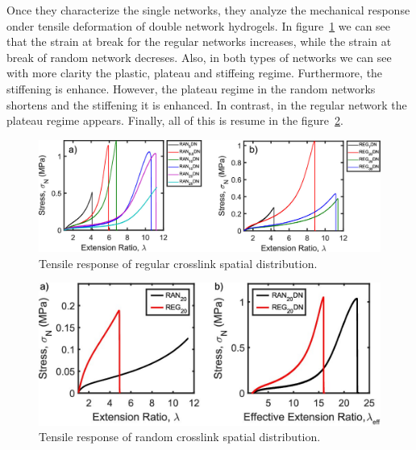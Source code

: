 Once they characterize the single networks, they analyze the mechanical response onder tensile deformation of double network hydrogels.
In figure~\ref{fig:REGRANDNnetworks} we can see that the strain at break for the regular networks increases, while the strain at break of random network decreses. 
Also, in both types of networks we can see with more clarity the plastic, plateau and stiffeing regime.
Furthermore, the stiffening is enhance.
However, the plateau regime in the random networks shortens and the stiffening it is enhanced.
In contrast, in the regular network the plateau regime appears.
Finally, all of this is resume in the figure~\ref{fig:REGRANDNcomparison}. 

\begin{figure}[ht!]
    \centering
    \includegraphics[width=12cm]{figs/explainMechResponse/REGRANDN.jpeg}
    \caption{Tensile response of regular crosslink spatial distribution\citep{kongEffectCrossLinkHomogeneity2024}.}\label{fig:REGRANDNnetworks}
\end{figure}

\newpage

\begin{figure}[ht!]
    \centering
    \includegraphics[width=12cm]{figs/explainMechResponse/comparissonREGRANDN.jpeg}
    \caption{Tensile response of random crosslink spatial distribution\citep{kongEffectCrossLinkHomogeneity2024}.}\label{fig:REGRANDNcomparison}
\end{figure}


